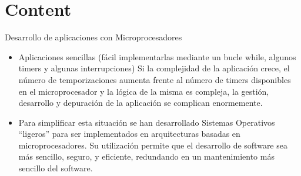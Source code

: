 \section{Content}

\begin{frame}{Desarrollo de aplicaciones con Microprocesadores}
    \begin{itemize}
        \item Aplicaciones sencillas (fácil implementarlas mediante un bucle while, algunos timers y algunas interrupciones)
Si la complejidad de la aplicación crece, el número de temporizaciones aumenta frente al número de timers disponibles en el microprocesador y la lógica de la misma es compleja, la gestión, desarrollo y depuración de la aplicación se complican enormemente.
        \item Para simplificar esta situación se han desarrollado Sistemas Operativos “ligeros” para ser implementados en arquitecturas basadas en microprocesadores. Su utilización permite que el desarrollo de software sea más sencillo, seguro, y eficiente, redundando en un mantenimiento más sencillo del software.      
    \end{itemize}
     \centering

\end{frame}




